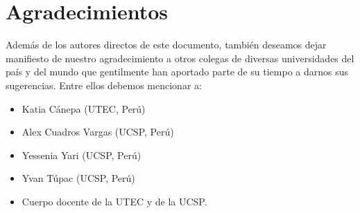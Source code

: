 \chapter*{Agradecimientos}\label{chap:cs-ack}
%

Además de los autores directos de este documento, también deseamos dejar manifiesto de nuestro 
agradecimiento a otros colegas de diversas universidades del país y del mundo que gentilmente 
han aportado parte de su tiempo a darnos sus sugerencias. Entre ellos debemos mencionar a:

\begin{itemize}
\item Katia Cánepa (UTEC, Perú)
\item Alex Cuadros Vargas (UCSP, Perú)
\item Yessenia Yari (UCSP, Perú)
\item Yvan Túpac (UCSP, Perú)
\item Cuerpo docente de la UTEC y de la UCSP.
\end{itemize}

\begin{comment}
\item Sociedad Peruana de Computación por apoyarnos y facilitarnos su documento de Curricula de Computación.
\item Dr. Ernesto Cuadros-Vargas (Universidad Católica de San Pablo, Arequipa) por su invaluable ayuda en la elaboración de la malla propuesta. 
\item Dr. César Beltrán Castañón (IME - Universidad Católica de San Pablo, Arequipa) por su invaluable ayuda en la elaboración de la malla propuesta. 
\item Julieta Flores y Johan Chicana Díaz por facilitarnos la base de sus estudios de mercado, recolección de datos y tabulación de resultados.
\item Dr. Glen Rodriguez (Universidad Nacional de Ingeniería) por su ayuda en la elaboración de la línea de Computación Distribuída.
\item Dr. José Luis Segovia (CONCYTEC y Universidad Peruana Cayetano Heredia) por su ayuda en la elaboración de la línea de Interacción Humano-Computador.
\item Dr. Jes\'us Castagnetto (Universidad Peruana Cayetano Heredia) por ayudarnos en la elaboración de la línea de Computación Distribuida y Bio-informática.
\item Dr. Mirko Zimic (Universidad Peruana Cayetano Heredia) por ayudarnos en la elaboración de la línea de Bio-informática.
\item Dr. Bruno Schulze (Laboratorio Nacional de Computa\c{c}\~ao Científica, Brasil) por su apoyo en la línea de investigación de aplicación de computación distribuida a la bio-informática.
\item Mg. Robinson Oliva (Universidad Nacional de Ingeniería) por su ayuda en la elaboración de los cursos relacionados con Arquitectura y Organización
\item Dr. A. M. Coronado (Universidad Nacional de Ingeniería) por su apoyo en la línea de investigación de Ciencia Computacional y Métodos Numéricos.
\end{comment}

